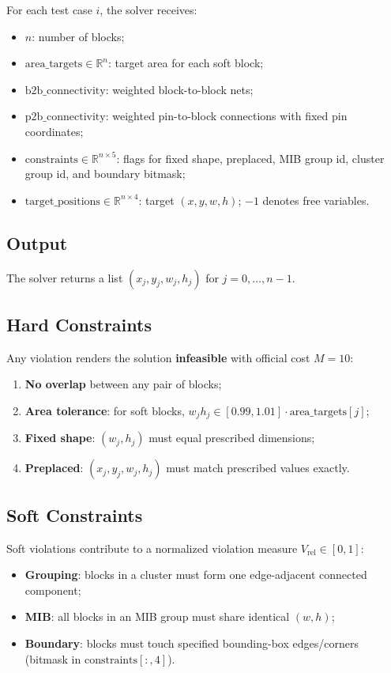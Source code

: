 \documentclass[11pt]{article}
\begin{document}
For each test case $i$, the solver receives:
\begin{itemize}[noitemsep]
    \item $n$: number of blocks;
    \item $\text{area\_targets} \in \mathbb{R}^n$: target area for each soft block;
    \item $\text{b2b\_connectivity}$: weighted block-to-block nets;
    \item $\text{p2b\_connectivity}$: weighted pin-to-block connections with fixed pin coordinates;
    \item $\text{constraints} \in \mathbb{R}^{n \times 5}$: flags for fixed shape, preplaced, MIB group id, cluster group id, and boundary bitmask;
    \item $\text{target\_positions} \in \mathbb{R}^{n \times 4}$: target $(x, y, w, h)$; $-1$ denotes free variables.
\end{itemize}

\subsection{Output}

The solver returns a list $(x_j, y_j, w_j, h_j)$ for $j = 0, \ldots, n-1$.

\subsection{Hard Constraints}

Any violation renders the solution \textbf{infeasible} with official cost $M = 10$:
\begin{enumerate}[noitemsep]
    \item \textbf{No overlap} between any pair of blocks;
    \item \textbf{Area tolerance}: for soft blocks, $w_j h_j \in [0.99, 1.01] \cdot \text{area\_targets}[j]$;
    \item \textbf{Fixed shape}: $(w_j, h_j)$ must equal prescribed dimensions;
    \item \textbf{Preplaced}: $(x_j, y_j, w_j, h_j)$ must match prescribed values exactly.
\end{enumerate}

\subsection{Soft Constraints}

Soft violations contribute to a normalized violation measure $V_{\text{rel}} \in [0,1]$:
\begin{itemize}[noitemsep]
    \item \textbf{Grouping}: blocks in a cluster must form one edge-adjacent connected component;
    \item \textbf{MIB}: all blocks in an MIB group must share identical $(w, h)$;
    \item \textbf{Boundary}: blocks must touch specified bounding-box edges/corners (bitmask in $\text{constraints}[:,4]$).
\end{itemize}
\end{document}
